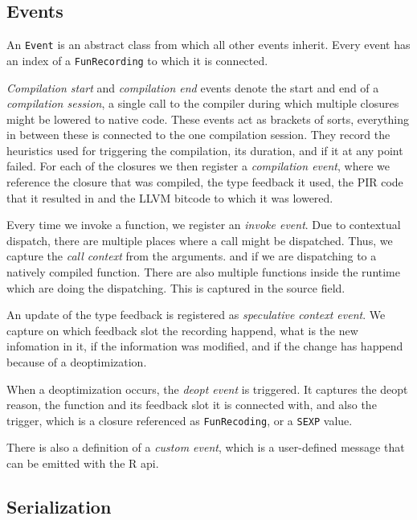 \subsection{Events}

An \texttt{Event} is an abstract class from which all other events inherit. Every event has an index of a \texttt{FunRecording} to which it is connected.

\textit{Compilation start} and \textit{compilation end} events denote the start and end of a \textit{compilation session}, a single call to the compiler during which multiple closures might be lowered to native code. These events act as brackets of sorts, everything in between these is connected to the one compilation session. They record the heuristics used for triggering the compilation, its duration, and if it at any point failed. For each of the closures we then register a \textit{compilation event}, where we reference the closure that was compiled, the type feedback it used, the PIR code that it resulted in and the LLVM bitcode to which it was lowered.

Every time we invoke a function, we register an \textit{invoke event}. Due to contextual dispatch, there are multiple places where a call might be dispatched. Thus, we capture the \textit{call context} from the arguments. and if we are dispatching to a natively compiled function. There are also multiple functions inside the runtime which are doing the dispatching. This is captured in the source field.

An update of the type feedback is registered as \textit{speculative context event}. We capture on which feedback slot the recording happend, what is the new infomation in it, if the information was modified, and if the change has happend because of a deoptimization.

When a deoptimization occurs, the \textit{deopt event} is triggered. It captures the deopt reason, the function and its feedback slot it is connected with, and also the trigger, which is a closure referenced as \texttt{FunRecoding}, or a \texttt{SEXP} value.

There is also a definition of a \textit{custom event}, which is a user-defined message that can be emitted with the R api.

\subsection{Serialization}

